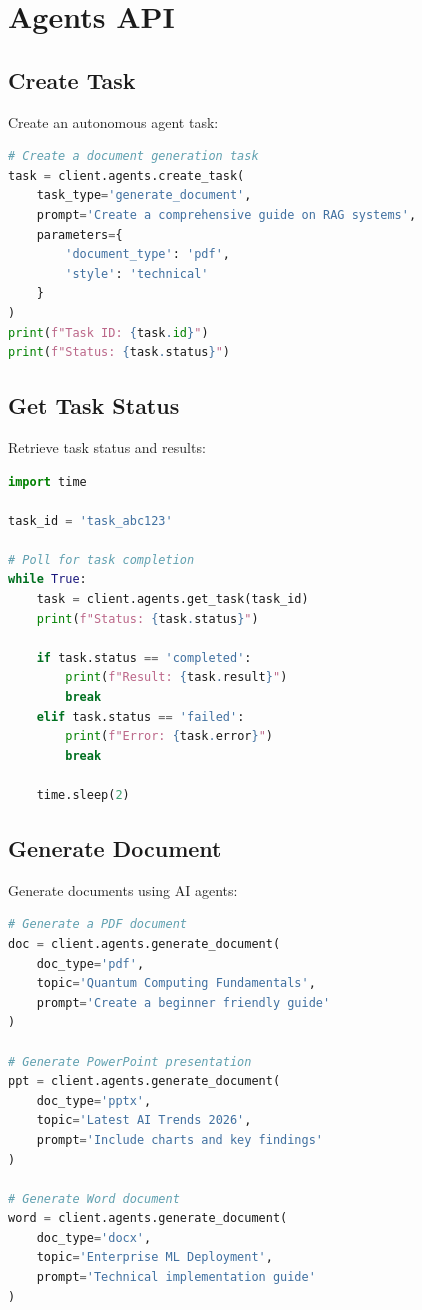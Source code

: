 \documentclass{report}
\begin{document}
\section{Agents API}

\subsection{Create Task}

Create an autonomous agent task:

\begin{lstlisting}[language=Python]
# Create a document generation task
task = client.agents.create_task(
    task_type='generate_document',
    prompt='Create a comprehensive guide on RAG systems',
    parameters={
        'document_type': 'pdf',
        'style': 'technical'
    }
)
print(f"Task ID: {task.id}")
print(f"Status: {task.status}")
\end{lstlisting}

\subsection{Get Task Status}

Retrieve task status and results:

\begin{lstlisting}[language=Python]
import time

task_id = 'task_abc123'

# Poll for task completion
while True:
    task = client.agents.get_task(task_id)
    print(f"Status: {task.status}")
    
    if task.status == 'completed':
        print(f"Result: {task.result}")
        break
    elif task.status == 'failed':
        print(f"Error: {task.error}")
        break
    
    time.sleep(2)
\end{lstlisting}

\subsection{Generate Document}

Generate documents using AI agents:

\begin{lstlisting}[language=Python]
# Generate a PDF document
doc = client.agents.generate_document(
    doc_type='pdf',
    topic='Quantum Computing Fundamentals',
    prompt='Create a beginner friendly guide'
)

# Generate PowerPoint presentation
ppt = client.agents.generate_document(
    doc_type='pptx',
    topic='Latest AI Trends 2026',
    prompt='Include charts and key findings'
)

# Generate Word document
word = client.agents.generate_document(
    doc_type='docx',
    topic='Enterprise ML Deployment',
    prompt='Technical implementation guide'
)
\end{lstlisting}
\end{document}
